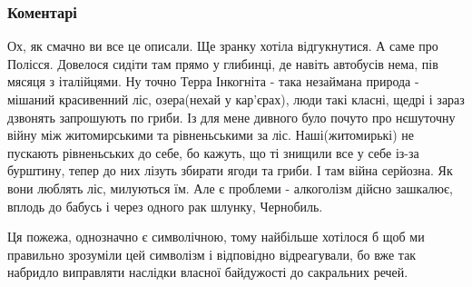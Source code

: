  
 
 
 
 
\subsubsection{Коментарі}

\begin{itemize} %
 

\obeycr
Ох, як смачно ви все це описали.
Ще зранку хотіла відгукнутися.
А саме про Полісся.
Довелося сидіти там прямо у глибинці, де навіть автобусів нема, пів мясяця з італійцями.
Ну точно Терра Інкогніта - така незаймана природа - мішаний красивенний ліс, озера(нехай у кар'єрах), люди такі класні, щедрі і зараз дзвонять запрошують по гриби.
Із для мене дивного було почуто про нєшуточну війну між житомирськими та рівненьськими за ліс.
Наші(житомирькі) не пускають рівненьських до себе, бо кажуть, що ті знищили все у себе із-за бурштину, тепер до них лізуть збирати ягоди та гриби. І там війна серйозна.
Як вони люблять ліс, милуються їм.
Але є проблеми - алкоголізм дійсно зашкалює, вплодь до бабусь і через одного рак шлунку, Чернобиль.
\restorecr

 

Ця пожежа, однозначно є символічною, тому найбільше хотілося б щоб ми правильно
зрозуміли цей символізм і відповідно відреагували, бо вже так набридло
виправляти наслідки власної байдужості до сакральних речей.


 


\end{itemize}
